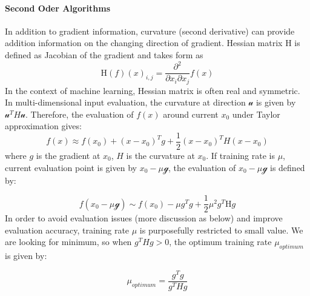 \paragraph{Second Oder Algorithms}
In addition to gradient information, curvature (second derivative) can provide addition information on the changing direction of gradient. Hessian matrix $\mathrm{H}$ is defined as Jacobian of the gradient and takes form as 
\begin{equation}
    \mathrm{H}(f)(x)_{i,j} = \frac{\partial^2}{\partial x_i \partial x_j}f(x)
\end{equation}
In the context of machine learning, Hessian matrix is often real and symmetric. In multi-dimensional input evaluation, the curvature at direction $\mathcal{u}$ is given by $\mathcal{u}^TH\mathcal{u}$. Therefore, the evaluation of $f(x)$ around current $x_0$ under Taylor approximation gives:
\begin{equation}
    \label{eq:TaylorEvaluation}
    f(x) \approx f(x_0)+(x-x_0)^Tg+\frac{1}{2}(x-x_0)^TH(x-x_0)
\end{equation}
where $g$ is the gradient at $x_0$, $H$ is the curvature at $x_0$. If training rate is $\mu$, current evaluation point is given by $x_0-\mu\mathcal{g}$, the evaluation of $x_0-\mu\mathcal{g}$ is defined by:

\begin{equation}
\label{eq:TaylorEvaStep}
    f(x_0-\mu\mathcal{g}) \sim f(x_0) - \mu g^Tg + \frac{1}{2}\mu^2g^T\mathrm{H}g
\end{equation}
In order to avoid evaluation issues (more discussion as below) and improve evaluation accuracy, training rate $\mu$ is purposefully restricted to small value. We are looking for minimum, so when $g^THg > 0$, the optimum training rate $\mu_{optimum}$ is given by:

\begin{equation}
    \mu_{optimum} = \frac{g^Tg}{g^THg}
\end{equation}